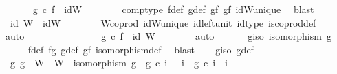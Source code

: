 \begin{isabellebody}
\ \ \ \ \isamarkupfalse%
\ {}{\isacharcolon}{\kern0pt}\ {\isachardoublequoteopen}g\ {\isasymcirc}\isactrlsub c\ f\ {\isacharequal}{\kern0pt}\ idW{\isacharprime}{\kern0pt}{\isachardoublequoteclose}\isanewline
\ \ \ \ \ \ \isamarkupfalse%
\ comp{\isacharunderscore}{\kern0pt}type\ f{\isacharunderscore}{\kern0pt}def\ g{\isacharunderscore}{\kern0pt}def\ gf{}\ gf{}\ idW{\isacharprime}{\kern0pt}{\isacharunderscore}{\kern0pt}unique\ \isamarkupfalse%
\ blast\isanewline
\ \ \ \ \isamarkupfalse%
\ {}{\isacharcolon}{\kern0pt}\ {\isachardoublequoteopen}id\ W{\isacharprime}{\kern0pt}\ {\isacharequal}{\kern0pt}\ idW{\isacharprime}{\kern0pt}{\isachardoublequoteclose}\isanewline
\ \ \ \ \ \ \isamarkupfalse%
\ W{\isacharprime}{\kern0pt}{\isacharunderscore}{\kern0pt}coprod\ idW{\isacharprime}{\kern0pt}{\isacharunderscore}{\kern0pt}unique\ id{\isacharunderscore}{\kern0pt}left{\isacharunderscore}{\kern0pt}unit{}\ id{\isacharunderscore}{\kern0pt}type\ is{\isacharunderscore}{\kern0pt}coprod{\isacharunderscore}{\kern0pt}def\ \isamarkupfalse%
\ auto\ \ \ \ \ \ \isanewline
\ \ \ \ \isamarkupfalse%
\ {}\ {}\ \isamarkupfalse%
\ {\isachardoublequoteopen}g\ {\isasymcirc}\isactrlsub c\ f\ {\isacharequal}{\kern0pt}\ id\ W{\isacharprime}{\kern0pt}{\isachardoublequoteclose}\isanewline
\ \ \ \ \ \ \isamarkupfalse%
\ auto\isanewline
\ \ \isamarkupfalse%
\isanewline
\isanewline
\ \ \isamarkupfalse%
\ g{\isacharunderscore}{\kern0pt}iso{\isacharcolon}{\kern0pt}\ {\isachardoublequoteopen}isomorphism\ g{\isachardoublequoteclose}\isanewline
\ \ \ \ \isamarkupfalse%
\ f{\isacharunderscore}{\kern0pt}def\ fg\ g{\isacharunderscore}{\kern0pt}def\ gf\ isomorphism{\isacharunderscore}{\kern0pt}def{}\ \isamarkupfalse%
\ blast\isanewline
\ \ \isamarkupfalse%
\ g{\isacharunderscore}{\kern0pt}iso\ g{\isacharunderscore}{\kern0pt}def\ \isamarkupfalse%
\ {\isachardoublequoteopen}{\isasymexists}\ g{\isachardot}{\kern0pt}\ g\ {\isacharcolon}{\kern0pt}\ W\ {\isasymrightarrow}\ W{\isacharprime}{\kern0pt}\ {\isasymand}\ isomorphism\ g\ {\isasymand}\ g\ {\isasymcirc}\isactrlsub c\ i\ \ {\isacharequal}{\kern0pt}\ i{\isacharprime}{\kern0pt}\ {\isasymand}\ g\ {\isasymcirc}\isactrlsub c\ i\ {\isacharequal}{\kern0pt}\ i{\isacharprime}{\kern0pt}\isanewline

\end{isabellebody}
